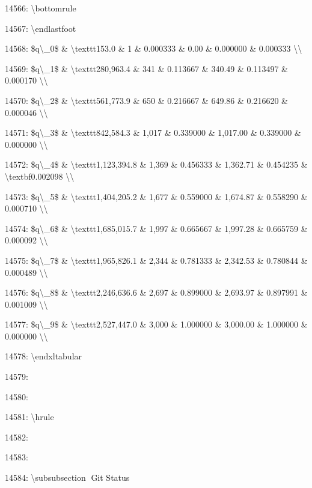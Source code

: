 \documentclass[11pt,a4paper]{article}
\begin{document}
14566: \textbackslash{}bottomrule

14567: \textbackslash{}endlastfoot

14568: \$q\textbackslash{}\_0\$ \& \textbackslash{}texttt{153.0} \& 1 \& 0.000333 \& 0.00 \& 0.000000 \& 0.000333 \textbackslash{}\textbackslash{}

14569: \$q\textbackslash{}\_1\$ \& \textbackslash{}texttt{280,963.4} \& 341 \& 0.113667 \& 340.49 \& 0.113497 \& 0.000170 \textbackslash{}\textbackslash{}

14570: \$q\textbackslash{}\_2\$ \& \textbackslash{}texttt{561,773.9} \& 650 \& 0.216667 \& 649.86 \& 0.216620 \& 0.000046 \textbackslash{}\textbackslash{}

14571: \$q\textbackslash{}\_3\$ \& \textbackslash{}texttt{842,584.3} \& 1,017 \& 0.339000 \& 1,017.00 \& 0.339000 \& 0.000000 \textbackslash{}\textbackslash{}

14572: \$q\textbackslash{}\_4\$ \& \textbackslash{}texttt{1,123,394.8} \& 1,369 \& 0.456333 \& 1,362.71 \& 0.454235 \& \textbackslash{}textbf{0.002098} \textbackslash{}\textbackslash{}

14573: \$q\textbackslash{}\_5\$ \& \textbackslash{}texttt{1,404,205.2} \& 1,677 \& 0.559000 \& 1,674.87 \& 0.558290 \& 0.000710 \textbackslash{}\textbackslash{}

14574: \$q\textbackslash{}\_6\$ \& \textbackslash{}texttt{1,685,015.7} \& 1,997 \& 0.665667 \& 1,997.28 \& 0.665759 \& 0.000092 \textbackslash{}\textbackslash{}

14575: \$q\textbackslash{}\_7\$ \& \textbackslash{}texttt{1,965,826.1} \& 2,344 \& 0.781333 \& 2,342.53 \& 0.780844 \& 0.000489 \textbackslash{}\textbackslash{}

14576: \$q\textbackslash{}\_8\$ \& \textbackslash{}texttt{2,246,636.6} \& 2,697 \& 0.899000 \& 2,693.97 \& 0.897991 \& 0.001009 \textbackslash{}\textbackslash{}

14577: \$q\textbackslash{}\_9\$ \& \textbackslash{}texttt{2,527,447.0} \& 3,000 \& 1.000000 \& 3,000.00 \& 1.000000 \& 0.000000 \textbackslash{}\textbackslash{}

14578: \textbackslash{}end{xltabular}

14579:

14580:

14581: \textbackslash{}hrule

14582:

14583:

14584: \textbackslash{}subsubsection{🐙 Git Status}
\end{document}
